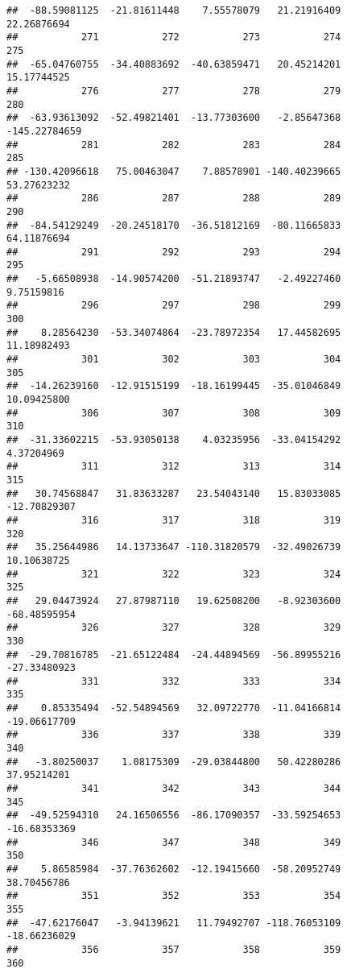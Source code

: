 \documentclass[
]{article}
\begin{document}
\begin{verbatim}
##  -88.59081125  -21.81611448    7.55578079   21.21916409   22.26876694 
##           271           272           273           274           275 
##  -65.04760755  -34.40883692  -40.63859471   20.45214201   15.17744525 
##           276           277           278           279           280 
##  -63.93613092  -52.49821401  -13.77303600   -2.85647368 -145.22784659 
##           281           282           283           284           285 
## -130.42096618   75.00463047    7.88578901 -140.40239665   53.27623232 
##           286           287           288           289           290 
##  -84.54129249  -20.24518170  -36.51812169  -80.11665833   64.11876694 
##           291           292           293           294           295 
##   -5.66508938  -14.90574200  -51.21893747   -2.49227460    9.75159816 
##           296           297           298           299           300 
##    8.28564230  -53.34074864  -23.78972354   17.44582695   11.18982493 
##           301           302           303           304           305 
##  -14.26239160  -12.91515199  -18.16199445  -35.01046849   10.09425800 
##           306           307           308           309           310 
##  -31.33602215  -53.93050138    4.03235956  -33.04154292    4.37204969 
##           311           312           313           314           315 
##   30.74568847   31.83633287   23.54043140   15.83033085  -12.70829307 
##           316           317           318           319           320 
##   35.25644986   14.13733647 -110.31820579  -32.49026739   10.10638725 
##           321           322           323           324           325 
##   29.04473924   27.87987110   19.62508200   -8.92303600  -68.48595954 
##           326           327           328           329           330 
##  -29.70816785  -21.65122484  -24.44894569  -56.89955216  -27.33480923 
##           331           332           333           334           335 
##    0.85335494  -52.54894569   32.09722770  -11.04166814  -19.06617709 
##           336           337           338           339           340 
##   -3.80250037    1.08175309  -29.03844800   50.42280286   37.95214201 
##           341           342           343           344           345 
##  -49.52594310   24.16506556  -86.17090357  -33.59254653  -16.68353369 
##           346           347           348           349           350 
##    5.86585984  -37.76362602  -12.19415660  -58.20952749   38.70456786 
##           351           352           353           354           355 
##  -47.62176047   -3.94139621   11.79492707 -118.76053109  -18.66236029 
##           356           357           358           359           360 

\end{verbatim}
\end{document}
